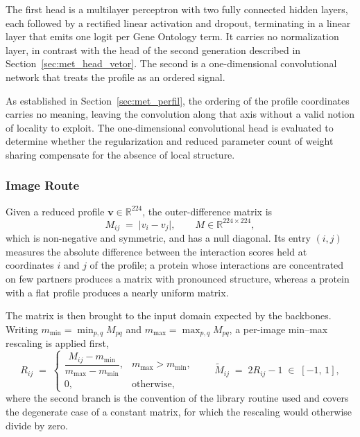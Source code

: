 \documentclass[Ingles]{ic-tese-v3}
\begin{document}
The first head is a multilayer perceptron with two fully connected hidden layers, each followed by a
rectified linear activation and dropout, terminating in a linear layer that emits one logit per Gene
Ontology term. It carries no normalization layer, in contrast with the head of the second generation
described in Section~\ref{sec:met_head_vetor}. The second is a one-dimensional convolutional
network that treats the
profile as an ordered signal.

As established in Section~\ref{sec:met_perfil}, the ordering of the profile coordinates carries no
meaning, leaving the convolution along that axis without a valid notion of locality to exploit.
The one-dimensional convolutional head is evaluated to determine whether the regularization and
reduced parameter count of weight sharing compensate for the absence of local structure.

\subsubsection{Image Route}
\label{sec:met_gen1_img}

Given a reduced profile $\mathbf{v} \in \mathbb{R}^{224}$, the outer-difference matrix is
\begin{equation}
  M_{ij} \;=\; \bigl| v_i - v_j \bigr|,
  \qquad
  M \in \mathbb{R}^{224 \times 224},
  \label{eq:met_outerdiff}
\end{equation}
\noindent which is non-negative and symmetric, and has a null diagonal. Its entry $(i,j)$ measures the absolute
difference between the interaction scores held at coordinates $i$ and $j$ of the profile; a protein
whose interactions are concentrated on few partners produces a matrix with pronounced structure,
whereas a protein with a flat profile produces a nearly uniform matrix.

The matrix is then brought to the input domain expected by the backbones. Writing
$m_{\min} = \min_{p,q} M_{pq}$ and $m_{\max} = \max_{p,q} M_{pq}$, a per-image min--max rescaling is
applied first,
\begin{equation}
  R_{ij} \;=\;
  \begin{cases}
    \dfrac{M_{ij} - m_{\min}}{m_{\max} - m_{\min}}, & m_{\max} > m_{\min}, \\[10pt]
    0, & \text{otherwise},
  \end{cases}
  \qquad
  \tilde{M}_{ij} \;=\; 2 R_{ij} - 1 \;\in\; [-1,\,1],
  \label{eq:met_imgnorm}
\end{equation}
\noindent where the second branch is the convention of the library routine used and covers the degenerate case
of a constant matrix, for which the rescaling would otherwise divide by zero.
\end{document}
